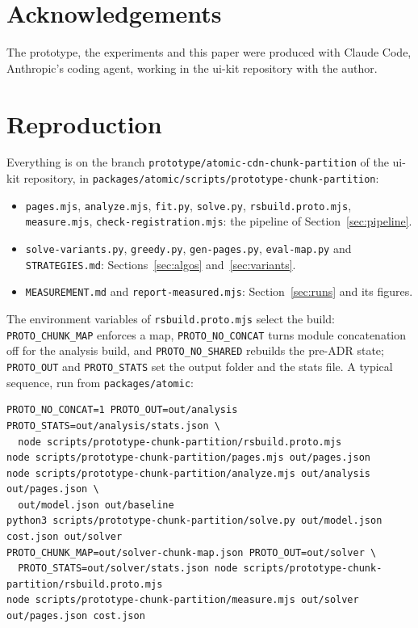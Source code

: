 \documentclass[11pt]{article}
\newcommand{\code}[1]{\texttt{#1}}
\begin{document}
\section*{Acknowledgements}
The prototype, the experiments and this paper were produced with Claude Code, Anthropic's coding agent, working in the ui-kit repository with the author.

\appendix

\section{Reproduction}\label{app:repro}
Everything is on the branch \code{prototype/atomic-cdn-chunk-partition} of the ui-kit repository, in \code{packages/atomic/scripts/prototype-chunk-partition}:
\begin{itemize}
\item \code{pages.mjs}, \code{analyze.mjs}, \code{fit.py}, \code{solve.py}, \code{rsbuild.proto.mjs}, \code{measure.mjs}, \code{check-registration.mjs}: the pipeline of Section~\ref{sec:pipeline}.
\item \code{solve-variants.py}, \code{greedy.py}, \code{gen-pages.py}, \code{eval-map.py} and \code{STRATEGIES.md}: Sections~\ref{sec:algos} and~\ref{sec:variants}.
\item \code{MEASUREMENT.md} and \code{report-measured.mjs}: Section~\ref{sec:runs} and its figures.
\end{itemize}
The environment variables of \code{rsbuild.proto.mjs} select the build: \code{PROTO\_CHUNK\_MAP} enforces a map, \code{PROTO\_NO\_CONCAT} turns module concatenation off for the analysis build, and \code{PROTO\_NO\_SHARED} rebuilds the pre-ADR state; \code{PROTO\_OUT} and \code{PROTO\_STATS} set the output folder and the stats file. A typical sequence, run from \code{packages/atomic}:
\par{\footnotesize
\begin{verbatim}
PROTO_NO_CONCAT=1 PROTO_OUT=out/analysis PROTO_STATS=out/analysis/stats.json \
  node scripts/prototype-chunk-partition/rsbuild.proto.mjs
node scripts/prototype-chunk-partition/pages.mjs out/pages.json
node scripts/prototype-chunk-partition/analyze.mjs out/analysis out/pages.json \
  out/model.json out/baseline
python3 scripts/prototype-chunk-partition/solve.py out/model.json cost.json out/solver
PROTO_CHUNK_MAP=out/solver-chunk-map.json PROTO_OUT=out/solver \
  PROTO_STATS=out/solver/stats.json node scripts/prototype-chunk-partition/rsbuild.proto.mjs
node scripts/prototype-chunk-partition/measure.mjs out/solver out/pages.json cost.json
\end{verbatim}
}
\end{document}
